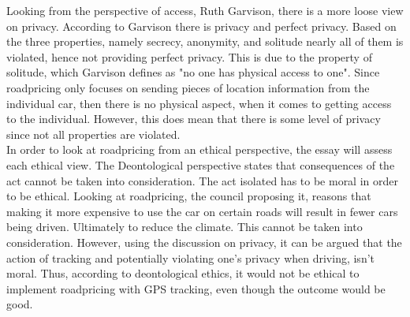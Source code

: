 Looking from the perspective of access, Ruth Garvison, there is a more loose view on privacy. According to Garvison there is privacy and perfect privacy. Based on the three properties, namely secrecy, anonymity, and solitude nearly all of them is violated, hence not providing perfect privacy. This is due to the property of solitude, which Garvison defines as "no one has physical access to one". Since roadpricing only focuses on sending pieces of location information from the individual car, then there is no physical aspect, when it comes to getting access to the individual. However, this does mean that there is some level of privacy since not all properties are violated. \\



\noindent In order to look at roadpricing from an ethical perspective, the essay will assess each ethical view. The Deontological perspective states that consequences of the act cannot be taken into consideration. The act isolated has to be moral in order to be ethical. Looking at roadpricing, the council proposing it, reasons that making it more expensive to use the car on certain roads will result in fewer cars being driven. Ultimately to reduce the climate. This cannot be taken into consideration. However, using the discussion on privacy, it can be argued that the action of tracking and potentially violating one's privacy when driving, isn't moral. Thus, according to deontological ethics, it would not be ethical to implement roadpricing with GPS tracking, even though the outcome would be good.

